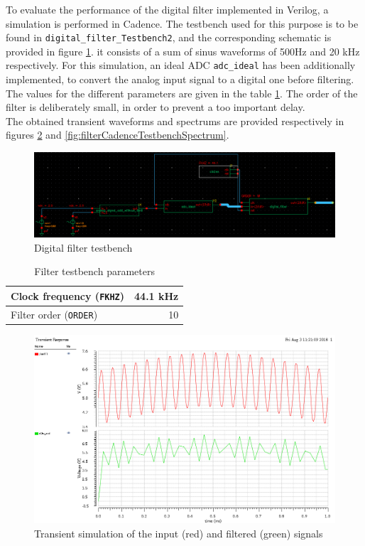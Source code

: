 To evaluate the performance of the digital filter implemented in Verilog, a simulation is performed in Cadence. The testbench used for this purpose is to be found in \texttt{digital\_filter\_Testbench2}, and the corresponding schematic is provided in figure \ref{fig:filterTestbench}. it consists of a sum of sinus waveforms of 500Hz and 20 kHz respectively. For this simulation, an ideal ADC \texttt{adc\_ideal} has been additionally implemented, to convert the analog input signal to a digital one before filtering. The values for the different parameters are given in the table \ref{table:filterTestbench}. The order of the filter is deliberately small, in order to prevent a too important delay.\\
The obtained transient waveforms and spectrums are provided respectively in figures \ref{fig:filterCadenceTestbenchTransient} and \ref{fig:filterCadenceTestbenchSpectrum}.
 

\begin{figure}[!h]
	\centering 
	\includegraphics[scale=0.55]{images/Filter/testbench.png}
	\caption{Digital filter testbench}
	\label{fig:filterTestbench}
\end{figure} 

\begin{table}[!h]
	\centering
	\begin{tabular}{|l|r|}
		\hline
		Clock frequency (\texttt{FKHZ}) & 44.1 kHz \\
		\hline
		Filter order (\texttt{ORDER}) & 10 \\
		\hline
	\end{tabular}
	\caption{Filter testbench parameters}
	\label{table:filterTestbench}
\end{table}

\begin{figure}[!h]
	\centering 
	\includegraphics[scale=0.6]{images/Filter/signal.png}
	\caption{Transient simulation of the input (red) and filtered (green) signals}
	\label{fig:filterCadenceTestbenchTransient}
\end{figure} 

